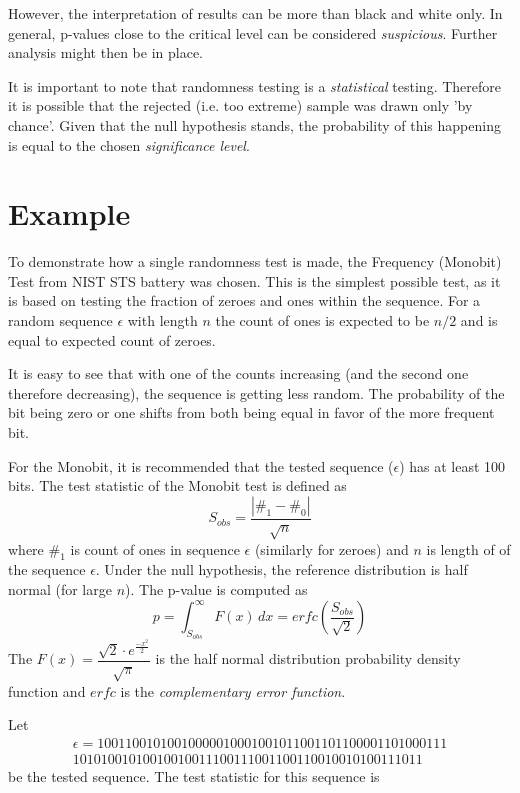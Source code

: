 \documentclass[
  digital,     %
  oneside,     %
  nosansbold,  %
  nocolorbold, %
  nolof,         %
  nolot,         %
]{fithesis4}
\begin{document}
However, the interpretation of results can be more than black and white only. In general, p-values close to the critical level can be considered \emph{suspicious}. Further analysis might then be in place. 

It is important to note that randomness testing is a \emph{statistical} testing. Therefore it is possible that the rejected (i.e. too extreme) sample was drawn only 'by chance'. Given that the null hypothesis stands, the probability of this happening is equal to the chosen \emph{significance level}.

\section{Example} \label{chap:rand-example}


To demonstrate how a single randomness test is made, the Frequency (Monobit) Test from NIST STS battery was chosen. \cite[p. 2-2]{nist_special} This is the simplest possible test, as it is based on testing the fraction of zeroes and ones within the sequence. For a random sequence $\epsilon$ with length $n$ the  count of ones is expected to be $n/2$ and is equal to expected count of zeroes.


It is easy to see that with one of the counts increasing (and the second one therefore decreasing), the sequence is getting less random. The probability of the bit being zero or one shifts from both being equal in favor of the more frequent bit.

For the Monobit, it is recommended that the tested sequence ($\epsilon$) has at least 100 bits. The test statistic of the Monobit test is defined as \[S_{obs} = \dfrac{|\#_1 - \#_0|}{\sqrt{n}}\] where $\#_1$ is count of ones in sequence $\epsilon$ (similarly for zeroes) and $n$ is length of of the sequence $\epsilon$. Under the null hypothesis, the reference distribution is half normal (for large $n$). The p-value is computed as \[ p = \int_{S_{obs}}^{\infty} F(x) \,dx = erfc(\dfrac{S_{obs}}{\sqrt{2}}) \] The $F(x) = \dfrac{\sqrt{2}\cdot e^{\frac{-x^2}{2}}}{\sqrt{\pi}}$ is the half normal distribution probability density function and $erfc$ is the \emph{complementary error function}.

 Let
\[\begin{split}
    \epsilon = 10011001010010000010001001011001101100001101000111\\10101001010010010011100111001100110010010100111011
\end{split}\]
 be the tested sequence. The test statistic for this sequence is 
\end{document}
